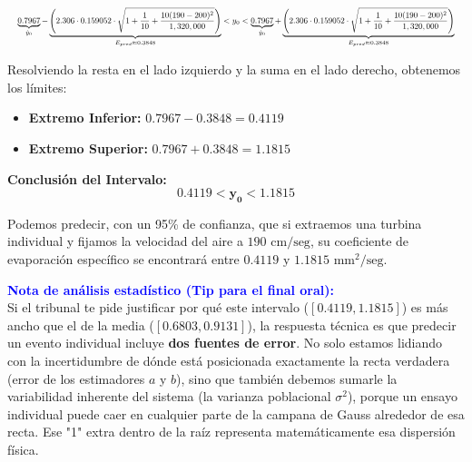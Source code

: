 \documentclass[11pt,a4paper]{article}
\begin{document}
\vspace{0.4cm}

\[
\resizebox{\textwidth}{!}{$\displaystyle
\underbrace{0.7967}_{\hat{y}_0} - \underbrace{\left( 2.306 \cdot 0.159052 \cdot \sqrt{1 + \frac{1}{10} + \frac{10(190 - 200)^2}{1,320,000}} \right)}_{E_{pred} \approx 0.3848} < y_0 < \underbrace{0.7967}_{\hat{y}_0} + \underbrace{\left( 2.306 \cdot 0.159052 \cdot \sqrt{1 + \frac{1}{10} + \frac{10(190 - 200)^2}{1,320,000}} \right)}_{E_{pred} \approx 0.3848}
$}
\]

\vspace{0.4cm}
\noindent Resolviendo la resta en el lado izquierdo y la suma en el lado derecho, obtenemos los límites:

\begin{itemize}
    \item \textbf{Extremo Inferior:} $0.7967 - 0.3848 = 0.4119$
    \item \textbf{Extremo Superior:} $0.7967 + 0.3848 = 1.1815$
\end{itemize}

\vspace{0.3cm}
\noindent \textbf{Conclusión del Intervalo:}
\[
\mathbf{0.4119 < y_0 < 1.1815}
\]

Podemos predecir, con un 95\% de confianza, que si extraemos una turbina individual y fijamos la velocidad del aire a $190 \text{ cm/seg}$, su coeficiente de evaporación específico se encontrará entre $0.4119 \text{ y } 1.1815 \text{ mm}^2\text{/seg}$.

\vspace{0.5cm}
\noindent \textcolor{blue}{\textbf{Nota de análisis estadístico (Tip para el final oral):}} \\
Si el tribunal te pide justificar por qué este intervalo ($[0.4119, 1.1815]$) es más ancho que el de la media ($[0.6803, 0.9131]$), la respuesta técnica es que predecir un evento individual incluye \textbf{dos fuentes de error}. No solo estamos lidiando con la incertidumbre de dónde está posicionada exactamente la recta verdadera (error de los estimadores $a$ y $b$), sino que también debemos sumarle la variabilidad inherente del sistema (la varianza poblacional $\sigma^2$), porque un ensayo individual puede caer en cualquier parte de la campana de Gauss alrededor de esa recta. Ese "1" extra dentro de la raíz representa matemáticamente esa dispersión física.
\end{document}
